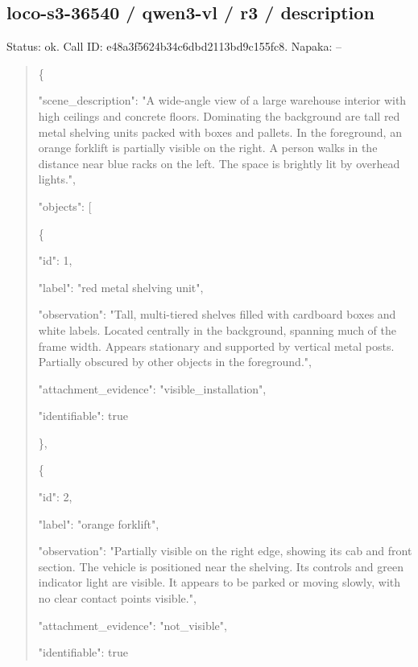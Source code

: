 \documentclass[10pt,a4paper]{article}
\begin{document}
\subsection*{loco-s3-36540 / qwen3-vl / r3 / description}
Status: ok. Call ID: e48a3f5624b34c6dbd2113bd9c155fc8. Napaka: --
\begin{quote}\footnotesize
\{\par
  "scene\_description":\allowbreak{} "A wide-angle view of a large warehouse interior with high ceilings and concrete floors. Dominating the background are tall red metal shelving units packed with boxes and pallets. In the foreground,\allowbreak{} an orange forklift is partially visible on the right. A person walks in the distance near blue racks on the left. The space is brightly lit by overhead lights.",\allowbreak{}\par
  "objects":\allowbreak{} [\par
    \{\par
      "id":\allowbreak{} 1,\allowbreak{}\par
      "label":\allowbreak{} "red metal shelving unit",\allowbreak{}\par
      "observation":\allowbreak{} "Tall,\allowbreak{} multi-tiered shelves filled with cardboard boxes and white labels. Located centrally in the background,\allowbreak{} spanning much of the frame width. Appears stationary and supported by vertical metal posts. Partially obscured by other objects in the foreground.",\allowbreak{}\par
      "attachment\_evidence":\allowbreak{} "visible\_installation",\allowbreak{}\par
      "identifiable":\allowbreak{} true\par
    \},\allowbreak{}\par
    \{\par
      "id":\allowbreak{} 2,\allowbreak{}\par
      "label":\allowbreak{} "orange forklift",\allowbreak{}\par
      "observation":\allowbreak{} "Partially visible on the right edge,\allowbreak{} showing its cab and front section. The vehicle is positioned near the shelving. Its controls and green indicator light are visible. It appears to be parked or moving slowly,\allowbreak{} with no clear contact points visible.",\allowbreak{}\par
      "attachment\_evidence":\allowbreak{} "not\_visible",\allowbreak{}\par
      "identifiable":\allowbreak{} true\par

\end{quote}
\end{document}
